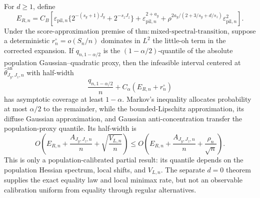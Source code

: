For \(d\ge1\), define
\[
E_{R,n}=C_B\left[
\varepsilon_{\mathrm{pil},n}\{2^{-(s_y+1)J_y}+2^{-s_zJ_z}\}
+\varepsilon_{\mathrm{pil},n}^{2+a_y}
+\rho^{2a_y/(2+3/s_y+d/s_z)}\varepsilon_{\mathrm{pil},n}^2
\right].
\]
Under the score-approximation premise of \(\mathrm{thm{:}mixed\text{-}spectral\text{-}transition}\), suppose a deterministic \(r_n^\circ=o(S_n/n)\) dominates in \(L^2\) the little-oh term in the corrected expansion.  If \(q_{n,1-\alpha/2}\) is the \((1-\alpha/2)\)-quantile of the absolute population Gaussian--quadratic proxy, then the infeasible interval centered at \(\widehat\theta^{\mathrm{an}}_{J_y,J_z,n}\) with half-width
\[
\frac{q_{n,1-\alpha/2}}n+C_\alpha(E_{R,n}+r_n^\circ)
\]
has asymptotic coverage at least \(1-\alpha\).  Markov's inequality allocates probability at most \(\alpha/2\) to the remainder, while the bounded-Lipschitz approximation, its diffuse Gaussian approximation, and Gaussian anti-concentration transfer the population-proxy quantile.  Its half-width is
\[
O\!\left(E_{R,n}+\frac{A_{J_y,J_z,n}}n+\sqrt{\frac{V_{L,n}}n}\right)
\le O\!\left(E_{R,n}+\frac{A_{J_y,J_z,n}}n+\frac{\rho_n}{\sqrt n}\right).
\]
This is only a population-calibrated partial result: its quantile depends on the population Hessian spectrum, local shifts, and \(V_{L,n}\).  The separate \(d=0\) theorem supplies the exact equality law and local minimax rate, but not an observable calibration uniform from equality through regular alternatives.